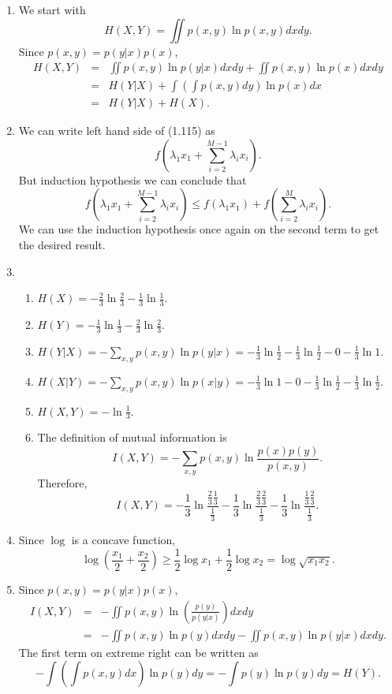 \begin{enumerate}
\item We start with
\[
H(X, Y) = \iint p(x, y)\ln p(x, y)dxdy.
\]
Since $p(x, y) = p(y|x)p(x)$,
\begin{eqnarray*}
H(X, Y) &=& \iint p(x, y)\ln p(y|x)dxdy + \iint p(x, y)\ln p(x)dxdy \\
 &=& H(Y|X) + \int\left(\int p(x, y)dy\right)\ln p(x)dx \\
 &=& H(Y|X) + H(X).
\end{eqnarray*}

\item We can write left hand side of (1.115) as
\[
f\left(\lambda_1 x_1 + \sum_{i=2}^{M-1}\lambda_i x_i\right).
\]
But induction hypothesis we can conclude that
\[
f\left(\lambda_1 x_1 + \sum_{i=2}^{M-1}\lambda_i x_i\right) \le f(\lambda_1 x_1) + f\left(\sum_{i=2}^{M} \lambda_i x_i\right).
\]
We can use the induction hypothesis once again on the second term to get the desired result.

\item 
\begin{enumerate}
\item $H(X) = -\frac{2}{3}\ln\frac{2}{3} - \frac{1}{3}\ln\frac{1}{3}$.
\item $H(Y) = -\frac{1}{3}\ln\frac{1}{3} - \frac{2}{3}\ln\frac{2}{3}$.
\item $H(Y|X) = -\sum_{x,y} p(x, y)\ln p(y|x) = -\frac{1}{3}\ln\frac{1}{2} - \frac{1}{3}\ln\frac{1}{2} - 0 - \frac{1}{3}\ln 1$.
\item $H(X|Y) = -\sum_{x,y} p(x, y)\ln p(x|y) = -\frac{1}{3}\ln 1 - 0 - \frac{1}{3}\ln\frac{1}{2} - \frac{1}{3}\ln\frac{1}{2}$.
\item $H(X, Y) = -\ln\frac{1}{3}$.
\item The definition of mutual information is
\[
I(X, Y) = -\sum_{x,y}p(x, y)\ln\frac{p(x)p(y)}{p(x, y)}.
\]
Therefore,
\[
I(X, Y) = -\frac{1}{3}\ln\frac{\frac{2}{3}\frac{1}{3}}{\frac{1}{3}} - \frac{1}{3}\ln\frac{\frac{2}{3}\frac{2}{3}}{\frac{1}{3}} - \frac{1}{3}\ln\frac{\frac{1}{3}\frac{2}{3}}{\frac{1}{3}}.
\]
\end{enumerate}

\item Since $\log$ is a concave function,
\[
\log\left(\frac{x_1}{2} + \frac{x_2}{2}\right) \ge \frac{1}{2}\log x_1 + \frac{1}{2}\log x_2 = \log\sqrt{x_1x_2}.
\]

\item Since $p(x, y) = p(y|x)p(x)$,
\begin{eqnarray*}
I(X, Y) &=& -\iint p(x, y)\ln\left(\frac{p(y)}{p(y|x)}\right)dxdy \\
 &=& -\iint p(x, y)\ln p(y) dxdy - \iint p(x, y)\ln p(y|x)dxdy.
\end{eqnarray*}
The first term on extreme right can be written as
\[
-\int\left(\int p(x, y)dx\right)\ln p(y)dy = -\int p(y)\ln p(y)dy = H(Y).
\]

\end{enumerate}

